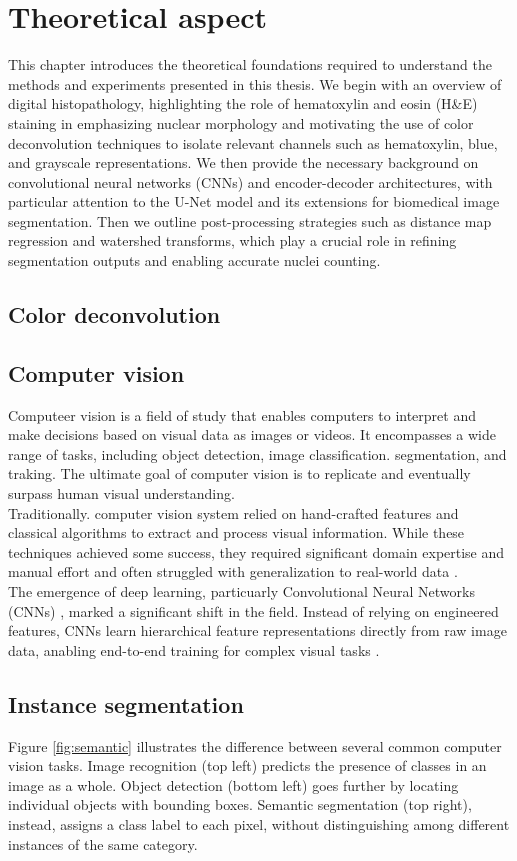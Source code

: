 \documentclass[target=bach,aauheader=,style=]{thud}
\begin{document}
\chapter{Theoretical aspect}
\label{sec:theory}
This chapter introduces the theoretical foundations required to understand the methods and experiments presented in this thesis. 
We begin with an overview of digital histopathology, highlighting the role of hematoxylin and eosin (H\&E) staining in emphasizing nuclear morphology and motivating the use of color deconvolution techniques to isolate relevant channels such as hematoxylin, blue, and grayscale representations. 
We then provide the necessary background on convolutional neural networks (CNNs) and encoder-decoder architectures, with particular attention to the U-Net model and its extensions for biomedical image segmentation. 
Then we outline post-processing strategies such as distance map regression and watershed transforms, which play a crucial role in refining segmentation outputs and enabling accurate nuclei counting.
\section{Color deconvolution}
\section{Computer vision}
Computeer vision is a field of study that enables computers to interpret and make decisions based on visual data as images or videos. It encompasses a wide range of tasks, including object detection, image classification. segmentation, and traking. The ultimate goal of computer vision is to replicate and eventually surpass human visual understanding. \\
Traditionally. computer vision system relied on hand-crafted features and classical algorithms to extract and process visual information. While these techniques achieved some success, they required significant domain expertise and manual effort and often struggled with generalization to real-world data \cite{lecun2015deep}.\\
The emergence of deep learning, particuarly Convolutional Neural Networks (CNNs) \cite{lecun1998gradient}, marked a significant shift in the field. Instead of relying on engineered features, CNNs learn hierarchical feature representations directly from raw image data, anabling end-to-end training for complex visual tasks \cite{krizhevsky2012imagenet}.
\section{Instance segmentation}
Figure \ref{fig:semantic} illustrates the difference between several common computer vision tasks. Image recognition (top left) predicts the presence of classes in an image as a whole. Object detection (bottom left) goes further by locating individual objects with bounding boxes. Semantic segmentation (top right), instead, assigns a class label to each pixel, without distinguishing among different instances of the same category. 
\end{document}
